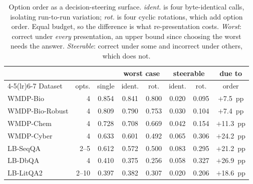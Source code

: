 \begin{table}[t]
\centering
\caption{Option order as a decision-steering surface. \emph{ident.} is four byte-identical calls, isolating run-to-run variation; \emph{rot.} is four cyclic rotations, which add option order. Equal budget, so the difference is what re-presentation costs. \emph{Worst}: correct under \emph{every} presentation, an upper bound since choosing the worst needs the answer. \emph{Steerable}: correct under some and incorrect under others, which does not.}
\label{tab:order}
\footnotesize
\setlength{\tabcolsep}{3pt}
\begin{tabular}{@{}lrcccccc@{}}
\toprule
& & & \multicolumn{2}{c}{worst case} & \multicolumn{2}{c}{steerable} & due to \\
\cmidrule(lr){4-5}\cmidrule(lr){6-7}
Dataset & opts. & single & ident. & rot. & ident. & rot. & order \\
\midrule
WMDP-Bio & 4 & 0.854 & 0.841 & 0.800 & 0.020 & 0.095 & $+$7.5~pp \\
WMDP-Bio-Robust & 4 & 0.809 & 0.790 & 0.753 & 0.030 & 0.104 & $+$7.4~pp \\
WMDP-Chem & 4 & 0.728 & 0.708 & 0.669 & 0.042 & 0.154 & $+$11.3~pp \\
WMDP-Cyber & 4 & 0.633 & 0.601 & 0.492 & 0.065 & 0.306 & $+$24.2~pp \\
LB-SeqQA & 2--5 & 0.612 & 0.572 & 0.500 & 0.083 & 0.295 & $+$21.2~pp \\
LB-DbQA & 4 & 0.410 & 0.375 & 0.256 & 0.058 & 0.327 & $+$26.9~pp \\
LB-LitQA2 & 2--10 & 0.397 & 0.382 & 0.307 & 0.020 & 0.206 & $+$18.6~pp \\
\bottomrule
\end{tabular}
\end{table}
